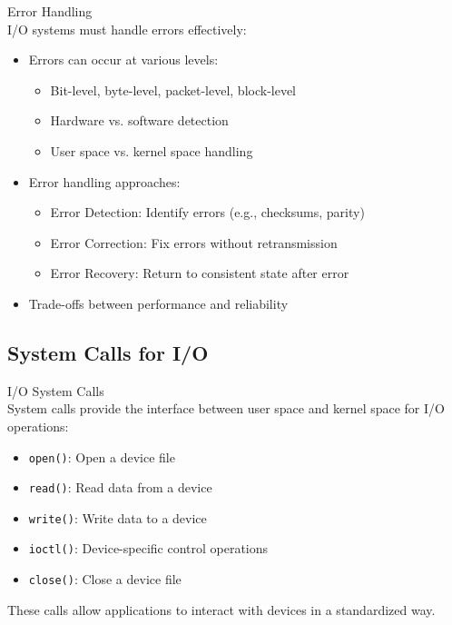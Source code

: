\begin{concept}{Error Handling}\\
    I/O systems must handle errors effectively:
    \begin{itemize}
        \item Errors can occur at various levels:
            \begin{itemize}
                \item Bit-level, byte-level, packet-level, block-level
                \item Hardware vs. software detection
                \item User space vs. kernel space handling
            \end{itemize}
        \item Error handling approaches:
            \begin{itemize}
                \item Error Detection: Identify errors (e.g., checksums, parity)
                \item Error Correction: Fix errors without retransmission
                \item Error Recovery: Return to consistent state after error
            \end{itemize}
        \item Trade-offs between performance and reliability
    \end{itemize}
\end{concept}

\multend

\raggedcolumns
\columnbreak

\subsection{System Calls for I/O}
\begin{definition}{I/O System Calls}\\
    System calls provide the interface between user space and kernel space for I/O operations:
    \begin{itemize}
        \item \texttt{open()}: Open a device file
        \item \texttt{read()}: Read data from a device
        \item \texttt{write()}: Write data to a device
        \item \texttt{ioctl()}: Device-specific control operations
        \item \texttt{close()}: Close a device file
    \end{itemize}
    These calls allow applications to interact with devices in a standardized way.
\end{definition}

